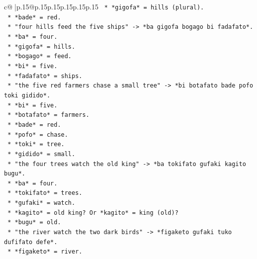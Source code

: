 \documentclass{article}
\begin{document}
{\begin{supertabular}{c@{$\;$}|p{.15\linewidth}@{}p{.15\linewidth}p{.15\linewidth}p{.15\linewidth}p{.15\linewidth}p{.15\linewidth}}
{{{\texttt{                                *   *gigofa* = hills (plural).} \\
\texttt{                                *   *bade* = red.} \\
\texttt{                            *   "four hills feed the five ships" {-}> *ba gigofa bogago bi fadafato*.} \\
\texttt{                                *   *ba* = four.} \\
\texttt{                                *   *gigofa* = hills.} \\
\texttt{                                *   *bogago* = feed.} \\
\texttt{                                *   *bi* = five.} \\
\texttt{                                *   *fadafato* = ships.} \\
\texttt{                            *   "the five red farmers chase a small tree" {-}> *bi botafato bade pofo toki gidido*.} \\
\texttt{                                *   *bi* = five.} \\
\texttt{                                *   *botafato* = farmers.} \\
\texttt{                                *   *bade* = red.} \\
\texttt{                                *   *pofo* = chase.} \\
\texttt{                                *   *toki* = tree.} \\
\texttt{                                *   *gidido* = small.} \\
\texttt{                            *   "the four trees watch the old king" {-}> *ba tokifato gufaki kagito bugu*.} \\
\texttt{                                *   *ba* = four.} \\
\texttt{                                *   *tokifato* = trees.} \\
\texttt{                                *   *gufaki* = watch.} \\
\texttt{                                *   *kagito* = old king? Or *kagito* = king (old)?} \\
\texttt{                                *   *bugu* = old.} \\
\texttt{                            *   "the river watch the two dark birds" {-}> *figaketo gufaki tuko dufifato defe*.} \\
\texttt{                                *   *figaketo* = river.} \\
}}}
\end{supertabular}}
\end{document}
